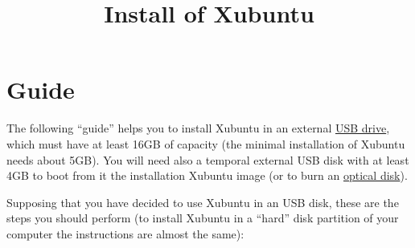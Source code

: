 \title{Install of Xubuntu}

\maketitle

\section{Guide}

The following ``guide'' helps you to install Xubuntu in an
external \href{https://en.wikipedia.org/wiki/USB_flash_drive}{USB
drive}, which must have at least 16GB of capacity (the minimal
installation of Xubuntu needs about 5GB). You will need also a
temporal external USB disk with at least 4GB to boot from it the
installation Xubuntu image (or to burn
an \href{https://en.wikipedia.org/wiki/Optical_disc}{optical disk}).

Supposing that you have decided to use Xubuntu in an USB disk,
these are the steps you should perform (to install Xubuntu in a ``hard'' disk
partition of your computer the instructions are almost the same):

